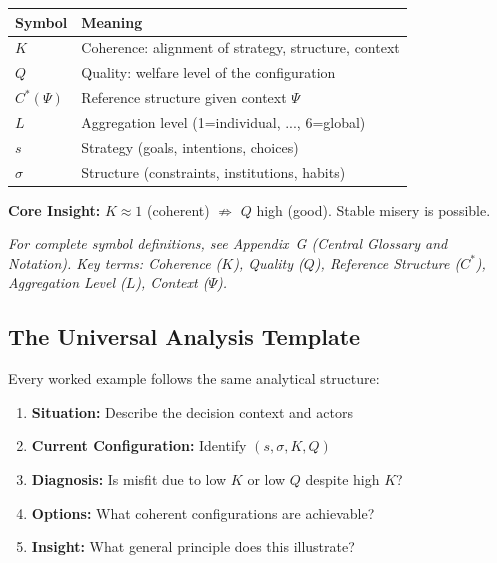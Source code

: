 \begin{tcolorbox}[colback=blue!5!white, colframe=blue!75!black,
    title=\textbf{Quick Reference: Key Concepts}]

\begin{tabular}{@{}ll@{}}
\textbf{Symbol} & \textbf{Meaning} \\
\hline
$K$ & Coherence: alignment of strategy, structure, context \\
$Q$ & Quality: welfare level of the configuration \\
$C^*(\Psi)$ & Reference structure given context $\Psi$ \\
$L$ & Aggregation level (1=individual, ..., 6=global) \\
$s$ & Strategy (goals, intentions, choices) \\
$\sigma$ & Structure (constraints, institutions, habits) \\
\end{tabular}

\textbf{Core Insight:} $K \approx 1$ (coherent) $\not\Rightarrow$ $Q$ high (good).
Stable misery is possible.

\end{tcolorbox}


\noindent\textit{For complete symbol definitions, see Appendix~G (Central Glossary
and Notation). Key terms: Coherence ($K$), Quality ($Q$), Reference Structure ($C^*$),
Aggregation Level ($L$), Context ($\Psi$).}


\subsection{The Universal Analysis Template}

Every worked example follows the same analytical structure:

\begin{enumerate}
    \item \textbf{Situation:} Describe the decision context and actors
    \item \textbf{Current Configuration:} Identify $(s, \sigma, K, Q)$
    \item \textbf{Diagnosis:} Is misfit due to low $K$ or low $Q$ despite high $K$?
    \item \textbf{Options:} What coherent configurations are achievable?
    \item \textbf{Insight:} What general principle does this illustrate?
\end{enumerate}

